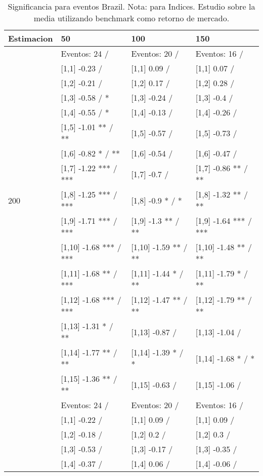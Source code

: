 \begin{table}

\caption{Significancia para eventos Brazil. Nota: para Indices. Estudio sobre la media utilizando benchmark como retorno de mercado.}
\centering
\begin{tabular}[t]{llll}
\toprule
Estimacion & 50 & 100 & 150\\
\midrule
 & Eventos:  24 / & Eventos:  20 / & Eventos:  16 /\\
 & {}[1,1] -0.23  / & {}[1,1] 0.09  / & {}[1,1] 0.07  /\\
 & {}[1,2] -0.21  / & {}[1,2] 0.17  / & {}[1,2] 0.28  /\\
 & {}[1,3] -0.58  / * & {}[1,3] -0.24  / & {}[1,3] -0.4  /\\
 & {}[1,4] -0.55  / * & {}[1,4] -0.13  / & {}[1,4] -0.26  /\\
\addlinespace
 & {}[1,5] -1.01 ** / ** & {}[1,5] -0.57  / & {}[1,5] -0.73  /\\
 & {}[1,6] -0.82 * / ** & {}[1,6] -0.54  / & {}[1,6] -0.47  /\\
 & {}[1,7] -1.22 *** / *** & {}[1,7] -0.7  / & {}[1,7] -0.86 ** / **\\
200 & {}[1,8] -1.25 *** / *** & {}[1,8] -0.9 * / * & {}[1,8] -1.32 ** / **\\
 & {}[1,9] -1.71 *** / *** & {}[1,9] -1.3 ** / ** & {}[1,9] -1.64 *** / ***\\
\addlinespace
 & {}[1,10] -1.68 *** / *** & {}[1,10] -1.59 ** / ** & {}[1,10] -1.48 ** / **\\
 & {}[1,11] -1.68 ** / *** & {}[1,11] -1.44 * / ** & {}[1,11] -1.79 * / **\\
 & {}[1,12] -1.68 *** / *** & {}[1,12] -1.47 ** / ** & {}[1,12] -1.79 ** / **\\
 & {}[1,13] -1.31 * / ** & {}[1,13] -0.87  / & {}[1,13] -1.04  /\\
 & {}[1,14] -1.77 ** / ** & {}[1,14] -1.39 * / * & {}[1,14] -1.68 * / *\\
\addlinespace
 & {}[1,15] -1.36 ** / ** & {}[1,15] -0.63  / & {}[1,15] -1.06  /\\
 & Eventos:  24 / & Eventos:  20 / & Eventos:  16 /\\
 & {}[1,1] -0.22  / & {}[1,1] 0.09  / & {}[1,1] 0.09  /\\
 & {}[1,2] -0.18  / & {}[1,2] 0.2  / & {}[1,2] 0.3  /\\
 & {}[1,3] -0.53  / & {}[1,3] -0.17  / & {}[1,3] -0.35  /\\
\addlinespace
 & {}[1,4] -0.37  / & {}[1,4] 0.06  / & {}[1,4] -0.06  /\\

\end{tabular}
\end{table}
